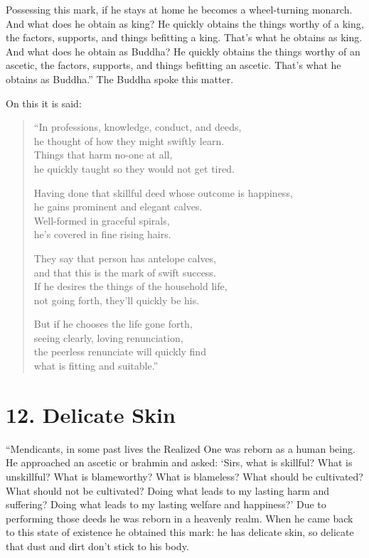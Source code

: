 \documentclass[12pt,openany]{book}%
\begin{document}
Possessing this mark, if he stays at home he becomes a wheel-turning monarch. And what does he obtain as king? He quickly obtains the things worthy of a king, the factors, supports, and things befitting a king. That’s what he obtains as king. And what does he obtain as Buddha? He quickly obtains the things worthy of an ascetic, the factors, supports, and things befitting an ascetic. That’s what he obtains as Buddha.” The Buddha spoke this matter. 

On this it is said: 

\begin{verse}%
“In professions, knowledge, conduct, and deeds, \\
he thought of how they might swiftly learn. \\
Things that harm no-one at all, \\
he quickly taught so they would not get tired. 

Having done that skillful deed whose outcome is happiness, \\
he gains prominent and elegant calves. \\
Well-formed in graceful spirals, \\
he’s covered in fine rising hairs. 

They say that person has antelope calves, \\
and that this is the mark of swift success. \\
If he desires the things of the household life, \\
not going forth, they’ll quickly be his. 

But if he chooses the life gone forth, \\
seeing clearly, loving renunciation, \\
the peerless renunciate will quickly find \\
what is fitting and suitable.” 

%
\end{verse}

\section*{12. Delicate Skin }

“Mendicants, in some past lives the Realized One was reborn as a human being. He approached an ascetic or brahmin and asked: ‘Sirs, what is skillful? What is unskillful? What is blameworthy? What is blameless? What should be cultivated? What should not be cultivated? Doing what leads to my lasting harm and suffering? Doing what leads to my lasting welfare and happiness?’ Due to performing those deeds he was reborn in a heavenly realm. When he came back to this state of existence he obtained this mark: he has delicate skin, so delicate that dust and dirt don’t stick to his body. 
\end{document}
